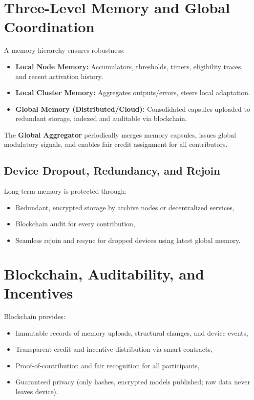 \documentclass[11pt]{article}
\begin{document}
\section{Three-Level Memory and Global Coordination}
A memory hierarchy ensures robustness:
\begin{itemize}
    \item \textbf{Local Node Memory:} Accumulators, thresholds, timers, eligibility traces, and recent activation history.
    \item \textbf{Local Cluster Memory:} Aggregates outputs/errors, steers local adaptation.
    \item \textbf{Global Memory (Distributed/Cloud):} Consolidated capsules uploaded to redundant storage, indexed and auditable via blockchain.
\end{itemize}
The \textbf{Global Aggregator} periodically merges memory capsules, issues global modulatory signals, and enables fair credit assignment for all contributors.

\subsection{Device Dropout, Redundancy, and Rejoin}
Long-term memory is protected through:
\begin{itemize}
    \item Redundant, encrypted storage by archive nodes or decentralized services,
    \item Blockchain audit for every contribution,
    \item Seamless rejoin and resync for dropped devices using latest global memory.
\end{itemize}

\section{Blockchain, Auditability, and Incentives}
Blockchain provides:
\begin{itemize}
    \item Immutable records of memory uploads, structural changes, and device events,
    \item Transparent credit and incentive distribution via smart contracts,
    \item Proof-of-contribution and fair recognition for all participants,
    \item Guaranteed privacy (only hashes, encrypted models published; raw data never leaves device).
\end{itemize}
\end{document}

